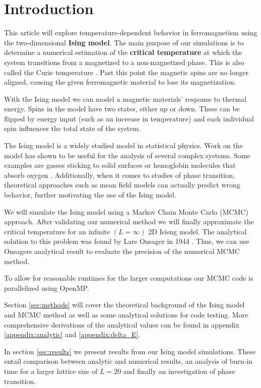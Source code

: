 \documentclass[english,notitlepage,reprint,nofootinbib]{revtex4-1}  %
\begin{document}
\section{Introduction}\label{sec:intro}
This article will explore temperature-dependent behavior in ferromagnetism using the two-dimensional \textbf{Ising model}. The main purpose of our simulations is to determine a numerical estimation of the \textbf{critical temperature} at which the system transitions from a magnetized to a non-magnetized phase. This is also called the Curie temperature \cite{compendium}. Past this point the magnetic spins are no longer aligned, causing the given ferromagnetic material to lose its magnetization.

With the Ising model we can model a magnetic materials' response to thermal energy. Spins in the model have two states, either up or down. These can be flipped by energy input (such as an increase in temperature) and each individual spin influences the total state of the system.

The Ising model is a widely studied model in statistical physics. Work on the model has shown to be useful for the analysis of several complex systems. Some examples are gasses sticking to solid surfaces or hemoglobin molecules that absorb oxygen \cite{compendium}. Additionally, when it comes to studies of phase transition, theoretical approaches such as mean field models can actually predict wrong behavior, further motivating the use of the Ising model.\cite{compendium}

We will simulate the Ising model using a Markov Chain Monte Carlo (MCMC) approach. After validating our numerical method we will finally approximate the critical temperature for an infinite $(L=\infty)$ 2D Isisng model. The analytical solution to this problem was found by Lars Onsager in 1944 \cite{project}. Thus, we can use Onsagers analytical result to evaluate the precision of the numerical MCMC method.

To allow for reasonable runtimes for the larger computations our MCMC code is parallelized using OpenMP.

Section \ref{sec:methods} will cover the theoretical background of the Ising model and MCMC method as well as some analytical solutions for code testing. More comprehensive derivations of the analytical values can be found in appendix \ref{appendix:analytic} and \ref{appendix:delta_E}.

In section \ref{sec:results} we present results from our Ising model simulations. These entail comparison between analytic and numerical results, an analysis of burn-in time for a larger lattice size of $L = 20$ and finally an investigation of phase transition.
\end{document}
